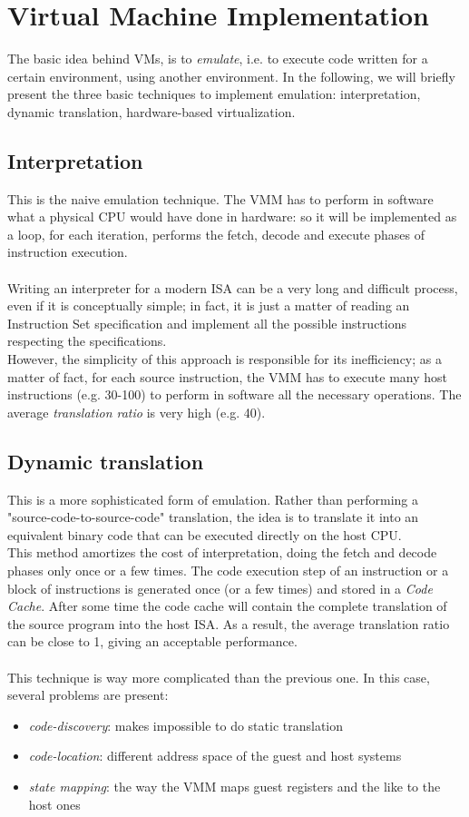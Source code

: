 \documentclass[a4paper, 12pt, titlepage]{report}
\begin{document}
\section{Virtual Machine Implementation}
The basic idea behind VMs, is to \textit{emulate}, i.e. to execute code written for a certain environment, using another environment. In the following, we will briefly present the three basic techniques to implement emulation: interpretation, dynamic translation, hardware-based virtualization.
\subsection{Interpretation}
This is the naive emulation technique. The VMM has to perform in software what a physical CPU would have done in hardware: so it will be implemented as a loop, for each iteration, performs  the fetch, decode and execute phases of instruction execution.
\\
\\
Writing an interpreter for a modern ISA can be a very long and difficult process, even if it is conceptually simple; in fact, it is just a matter of reading an Instruction Set specification and implement all the possible instructions respecting the specifications.\\
However, the simplicity of this approach is responsible for its inefficiency; as a matter of fact, for each source instruction, the VMM has to execute many host instructions (e.g. 30-100) to perform in software all the necessary operations. The average \textit{translation ratio} is very high (e.g. 40).
\subsection{Dynamic translation} \label{subsec:dyn_tr}
This is a more sophisticated form of emulation. Rather than performing a "source-code-to-source-code" translation, the idea is to translate it into an equivalent binary code that can be executed directly on the host CPU.\\
This method amortizes the cost of interpretation, doing the fetch and decode phases only once or a few times. The code execution step of an instruction or a block of instructions is generated once (or a few times) and stored in a \textit{Code Cache}. After some time the code cache will contain the complete translation of the source program into the host ISA.\newline
As a result, the average translation ratio can be close to 1, giving an acceptable performance.
\\
\\
This technique is way more complicated than the previous one. In this case, several problems are present:
\begin{itemize}
\item \textit{code-discovery}: makes impossible to do static translation
\item \textit{code-location}: different address space of the guest and host systems
\item \textit{state mapping}: the way the VMM maps guest registers and the like to the host ones
\end{itemize}
\end{document}
